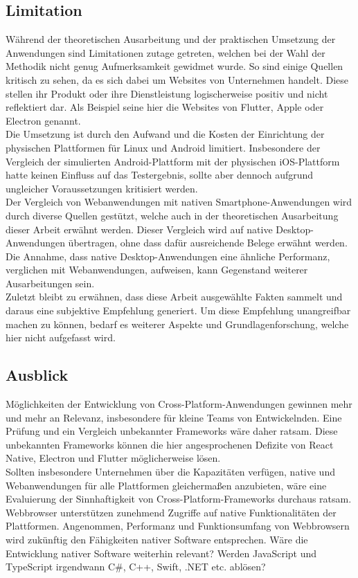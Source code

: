\documentclass[a4paper]{scrartcl}
\begin{document}
\subsection{Limitation}
Während der theoretischen Ausarbeitung und der praktischen Umsetzung der Anwendungen sind Limitationen zutage getreten, welchen bei der Wahl der Methodik nicht genug Aufmerksamkeit gewidmet wurde. So sind einige Quellen kritisch zu sehen, da es sich dabei um Websites von Unternehmen handelt. Diese stellen ihr Produkt oder ihre Dienstleistung logischerweise positiv und nicht reflektiert dar. Als Beispiel seine hier die Websites von Flutter, Apple oder Electron genannt. \\
Die Umsetzung ist durch den Aufwand und die Kosten der Einrichtung der physischen Plattformen für Linux und Android limitiert. Insbesondere der Vergleich der simulierten Android-Plattform mit der physischen iOS-Plattform hatte keinen Einfluss auf das Testergebnis, sollte aber dennoch aufgrund ungleicher Voraussetzungen kritisiert werden. \\
Der Vergleich von Webanwendungen mit nativen Smartphone-Anwendungen wird durch diverse Quellen gestützt, welche auch in der theoretischen Ausarbeitung dieser Arbeit erwähnt werden. Dieser Vergleich wird auf native Desktop-Anwendungen übertragen, ohne dass dafür ausreichende Belege erwähnt werden. Die Annahme, dass native Desktop-Anwendungen eine ähnliche Performanz, verglichen mit Webanwendungen, aufweisen, kann Gegenstand weiterer Ausarbeitungen sein. \\
Zuletzt bleibt zu erwähnen, dass diese Arbeit ausgewählte Fakten sammelt und daraus eine subjektive Empfehlung generiert. Um diese Empfehlung unangreifbar machen zu können, bedarf es weiterer Aspekte und Grundlagenforschung, welche hier nicht aufgefasst wird.

\subsection{Ausblick}
Möglichkeiten der Entwicklung von Cross-Platform-Anwendungen gewinnen mehr und mehr an Relevanz, insbesondere für kleine Teams von Entwickelnden. Eine Prüfung und ein Vergleich unbekannter Frameworks wäre daher ratsam. Diese unbekannten Frameworks können die hier angesprochenen Defizite von React Native, Electron und Flutter möglicherweise lösen. \\
Sollten insbesondere Unternehmen über die Kapazitäten verfügen, native und Webanwendungen für alle Plattformen gleichermaßen anzubieten, wäre eine Evaluierung der Sinnhaftigkeit von Cross-Platform-Frameworks durchaus ratsam. \\
Webbrowser unterstützen zunehmend Zugriffe auf native Funktionalitäten der Plattformen. Angenommen, Performanz und Funktionsumfang von Webbrowsern wird zukünftig den Fähigkeiten nativer Software entsprechen. Wäre die Entwicklung nativer Software weiterhin relevant? Werden JavaScript und TypeScript irgendwann C\#, C++, Swift, .NET etc. ablösen?
\end{document}
